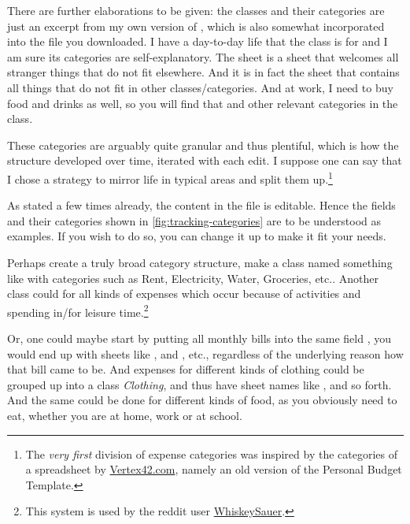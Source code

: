 There are further elaborations to be given:
the classes and their categories are just an excerpt from my own version of \tfn, which is also somewhat incorporated into the file you downloaded.
I have a day-to-day life that the class  is for and I am sure its categories are self-explanatory.
The sheet  is a sheet that welcomes all stranger things that do not fit elsewhere.
And it is in fact the sheet that contains all  things that do not fit in other classes/categories.
And at work, I need to buy food and drinks as well, so you will find that and other relevant categories in the  class.

These categories are arguably quite granular and thus plentiful, which is how the structure developed over time, iterated with each edit.
I suppose one can say that I chose a strategy to mirror life in typical areas and split them up.\footnote{The \emph{very first} division of expense categories was inspired by the categories of a spreadsheet by \href{https://www.vertex42.com/}{Vertex42.com}, namely an old version of the Personal Budget Template.}

As stated a few times already, the content in the file is editable.
Hence the fields and their categories shown in \autoref{fig:tracking-categories} are to be understood as examples.
If you wish to do so, you can change it up to make it fit your needs.

Perhaps create a truly broad category structure, \ie make a class named something like  with categories such as Rent, Electricity, Water, Groceries, etc..
Another class could  for all kinds of expenses which occur because of activities and spending in/for leisure time.\footnote{This system is used by the reddit user \href{https://www.reddit.com/r/personalfinance/comments/aayvms/oc_i_tracked_every_dollar_i_spent_over_the_last_8/}{WhiskeySauer}.}

Or, one could maybe start by putting all monthly bills into the same field , \ie you would end up with sheets like ,  and , etc., regardless of the underlying reason how that bill came to be.
And expenses for different kinds of clothing could be grouped up into a class \emph{Clothing}, and thus have sheet names like ,  and so forth.
And the same could be done for different kinds of food, as you obviously need to eat, whether you are at home, work or at school.

